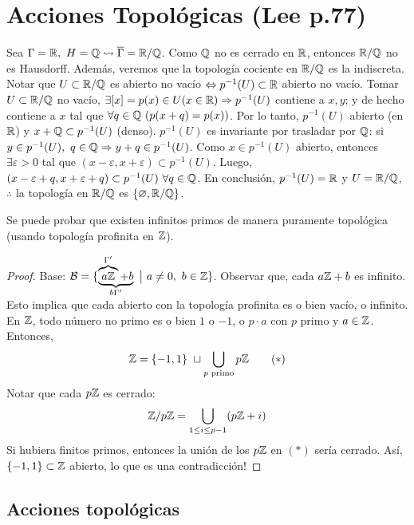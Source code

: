 \section{Acciones Topológicas (Lee p.77)}

\begin{eg}
	Sea $\Gamma = \mathbb{R},\ H = \mathbb{Q} \leadsto \overline{\Gamma} = \mathbb{R} / \mathbb{Q}$. Como $\mathbb{Q}$ no es cerrado en $\mathbb{R}$, entonces $\mathbb{R} / \mathbb{Q}$ no es Hausdorff. Además, veremos que la topología cociente en $\mathbb{R} / \mathbb{Q}$ es la indiscreta. Notar que $U \subset \mathbb{R} / \mathbb{Q}$ es abierto no vacío $\Leftrightarrow p^{-1}(U) \subset \mathbb{R}$ abierto no vacío. Tomar $U \subset \mathbb{R} / \mathbb{Q}$ no vacío, $\exists [x] = p(x) \in U (x \in \mathbb{R}) \Rightarrow p^{-1}(U)$ contiene a $x,y$; y de hecho contiene a $x$ tal que $\forall q \in \mathbb{Q} \ (p(x+q) = p(x))$. Por lo tanto, $p^{-1}(U)$ abierto (en $\mathbb{R}$) y $x+\mathbb{Q} \subset p^{-1}(U)$ (denso). $p^{-1}(U)$ es invariante por trasladar por $\mathbb{Q}$: si $y \in p^{-1}(U),\ q \in \mathbb{Q} \Rightarrow y+q \in p^{-1}(U)$. Como $x \in p^{-1}(U)$ abierto, entonces $\exists \varepsilon > 0$ tal que $(x-\varepsilon, x + \varepsilon) \subset p^{-1}(U)$. Luego, $(x - \varepsilon + q, x + \varepsilon + q) \subset p^{-1}(U)\ \forall q \in \mathbb{Q}$. En conclusión, $p^{-1}(U) = \mathbb{R}$ y $U = \mathbb{R} / \mathbb{Q}$, $\therefore$ la topología en $\mathbb{R} / \mathbb{Q} $ es $\{ \varnothing, \mathbb{R} / \mathbb{Q} \}$.
\end{eg}
\medskip
\begin{eg}[Furstenberg]
	Se puede probar que existen infinitos primos de manera puramente topológica (usando topología profinita en $\mathbb{Z}$).
\end{eg}

\begin{proof}
	Base: $\mathcal{B} = \{ \underbrace{\overbrace{a\mathbb{Z}}^{\Gamma'} + b}_{b\Gamma'} \ \big| \ a \neq 0,\ b \in \mathbb{Z} \}$. Observar que, cada $a\mathbb{Z} + b$ es infinito. Esto implica que cada abierto con la topología profinita es o bien vacío, o infinito. En $\mathbb{Z}$, todo número no primo es o bien $1$ o $-1$, o $p\cdot a$ con $p$ primo y $a \in \mathbb{Z}$. Entonces, 
	\[ \mathbb{Z} = \{-1,1\} \ \sqcup \bigcup_{p\text{ primo}} p\mathbb{Z} \tag{$*$} \]
	Notar que cada $p\mathbb{Z}$ es cerrado:
	\[ \mathbb{Z} / p\mathbb{Z} = \bigcup_{1 \leq i \leq p-1}(p\mathbb{Z} + i) \]
	Si hubiera finitos primos, entonces la unión de los $p\mathbb{Z}$ en $(*)$ sería cerrado. Así, $\{-1,1\} \subset \mathbb{Z}$ abierto, lo que es una contradicción! 
\end{proof}

\subsection*{Acciones topológicas}

